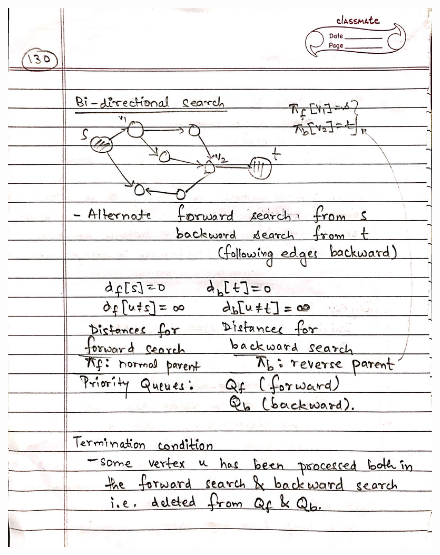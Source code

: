 \begin{figure}[H]
    \centering
    \includegraphics[scale=0.25]{"./MIT-6.006/MIT-6006-130"}
\end{figure}
\newpage
